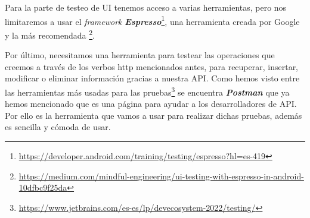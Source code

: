 Para la parte de testeo de UI tenemos acceso a varias herramientas, pero nos limitaremos a usar el \textit{framework} \textbf{\textit{Espresso}}\footnote{\url{https://developer.android.com/training/testing/espresso?hl=es-419}}, una herramienta creada por Google y la más recomendada \footnote{\url{https://medium.com/mindful-engineering/ui-testing-with-espresso-in-android-10dfbc9f25da}}.

Por último, necesitamos una herramienta para testear las operaciones que creemos a través de los verbos http mencionados antes, para  recuperar, insertar, modificar o eliminar información gracias a nuestra API. Como hemos visto entre las herramientas más usadas para las pruebas\footnote{\url{https://www.jetbrains.com/es-es/lp/devecosystem-2022/testing/}} se encuentra \textit{\textbf{Postman}} que ya hemos mencionado que es una página para ayudar a los desarrolladores de API. Por ello es la herramienta que vamos a usar para realizar dichas pruebas, además es sencilla y cómoda de usar.







